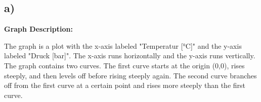 

\subsection*{a)}

\textbf{Graph Description:}

The graph is a plot with the x-axis labeled "Temperatur [°C]" and the y-axis labeled "Druck [bar]". The x-axis runs horizontally and the y-axis runs vertically. The graph contains two curves. The first curve starts at the origin (0,0), rises steeply, and then levels off before rising steeply again. The second curve branches off from the first curve at a certain point and rises more steeply than the first curve.